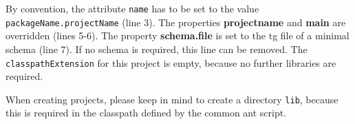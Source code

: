 \documentclass[a4paper,twoside,11pt,bibtotoc]{article}
\begin{document}
By convention, the attribute \texttt{name} has to be set to the value \texttt{packageName.projectName} (line 3).
The properties \textbf{projectname} and \textbf{main} are overridden (lines 5-6).
The property \textbf{schema.file} is set to the tg file of a minimal schema (line 7).
If no schema is required, this line can be removed.
The \texttt{classpathExtension} for this project is empty, because no further libraries are required.

When creating projects, please keep in mind to create a directory \texttt{lib}, because this is required in the classpath defined by the common ant script.
\clearpage
 
%
%
%
\end{document}
